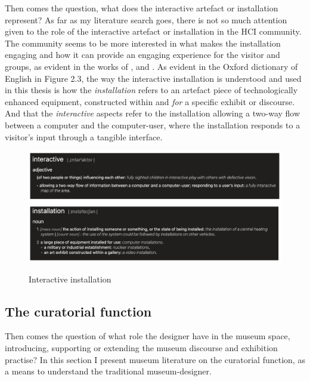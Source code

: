 Then comes the question, what does the interactive artefact or installation represent? As far as my literature search goes, there is not so much attention given to the role of the interactive artefact or installation in the HCI community. The community seems to be more interested in what makes the installation engaging and how it can provide an engaging experience for the visitor and groups, as evident in the works of \autocite{hornecker_learning_2006}, and \autocite{ciolfi_designing_2012}. As evident in the Oxford dictionary of English in Figure 2.3, the way the interactive installation is understood and used in this thesis is how the \emph{installation} refers to an artefact piece of technologically enhanced equipment, constructed within and \emph{for} a specific exhibit or discourse. And that the \emph{interactive} aspects refer to the installation allowing a two-way flow between a computer and the computer-user, where the installation responds to a visitor's input through a tangible interface.

\begin{figure}[H]
\centering
\includegraphics[width=12.5cm]{pictures/background/interactive_installation.png}
\caption{Interactive installation}{\autocite{Oxford_dictionary}}
\end{figure}


\subsection{The curatorial function}
Then comes the question of what role the designer have in the museum space, introducing, supporting or extending the museum discourse and exhibition practise? In this section I present museum literature on the curatorial function, as a means to understand the traditional museum-designer.

